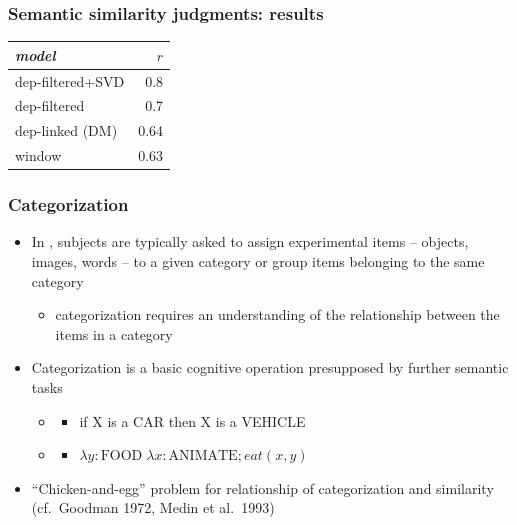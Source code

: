 \begin{frame}
\frametitle{Semantic similarity judgments: results}
    \begin{center}
      \begin{tabular}{|l|r|}
      \hline
      \emph{model} & $r$\\
      \hline
      \hline
      dep-filtered+SVD & 0.8\\
      \hline
      dep-filtered    & 0.7\\
      \hline
      dep-linked  (DM) & 0.64\\
      \hline
      window & 0.63\\
      \hline
    \end{tabular}

    \gap[1]
      \end{center}
\end{frame}




\begin{frame}
\frametitle{Categorization}

\begin{itemize}
\item In , subjects are typically asked to assign experimental items -- objects, images, words -- to a given category or group items belonging to the same category
\begin{itemize}
\item categorization requires an understanding of the relationship between the items in a category
\end {itemize}
\item Categorization is a basic cognitive operation presupposed by further semantic tasks
\begin{itemize}
\item {}
\begin{itemize}
\item if X is a CAR then X is a VEHICLE
\end{itemize}
\item {}
\begin{itemize}
\item $\lambda y:\text{FOOD}\; \lambda x:\text{ANIMATE}; eat(x,y)$
\end{itemize}
\end{itemize}
\item ``Chicken-and-egg'' problem for relationship of categorization and similarity (cf.\ Goodman 1972, Medin et al.\ 1993)
\end{itemize}
\end{frame}


